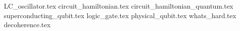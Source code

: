 {LC_oscillator.tex}
{circuit_hamiltonian.tex}
{circuit_hamiltonian_quantum.tex}
{superconducting_qubit.tex}
{logic_gate.tex}
{physical_qubit.tex}
{whats_hard.tex}
{decoherence.tex}
